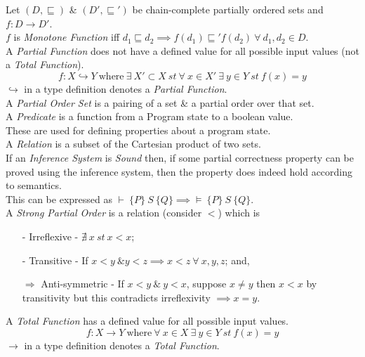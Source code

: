 \documentclass[11pt,a4paper]{article}
\begin{document}
Let $(D,\sqsubseteq)$ \& $(D',\sqsubseteq')$ be chain-complete partially ordered sets and $f:D\to D'$.\\
$f$ is \textit{Monotone Function} iff $d_1\sqsubseteq d_2\implies f(d_1)\sqsubseteq' f(d_2)\ \forall\ d_1,d_2\in D$.\\

A \textit{Partial Function} does not have a defined value for all possible input values (\ie not a \textit{Total Function}).
$$f:X\hookrightarrow Y\mathrm{\ where\ }\exists\ X'\subset X\ st\ \forall\ x\in X'\ \exists\ y\in Y\ st\ f(x)=y$$
\NB $\hookrightarrow$ in a type definition denotes a \textit{Partial Function}.\\

A \textit{Partial Order Set} is a pairing of a set \& a partial order over that set.\\

A \textit{Predicate} is a function from a Program state to a boolean value.\\
These are used for defining properties about a program state.\\

A \textit{Relation} is a subset of the Cartesian product of two sets.\\

If an \textit{Inference System} is \textit{Sound} then, if some partial correctness property can be proved using the inference system, then the property does indeed hold according to semantics.\\
\NB This can be expressed as $\vdash\ \{P\}\ S\ \{Q\}\implies\vDash\ \{P\}\ S\ \{Q\}$.\\

A \textit{Strong Partial Order} is a relation (consider $<$) which is
\begin{enumerate}[label=\roman*)]
	\item[-] Irreflexive - $\nexists\ x\ st\ x<x$;
	\item[-] Transitive - If $x<y\ \& y<z\implies x<z\ \forall\ x,y,z$; and,
	\item[$\Rightarrow$] Anti-symmetric - If $x<y\ \&\ y<x$, suppose $x\neq y$ then $x<x$ by transitivity but this contradicts irreflexivity $\implies x=y$.
\end{enumerate}

A \textit{Total Function} has a defined value for all possible input values.
$$f:X\to Y \mathrm{\ where\ }\forall\ x\in X\ \exists\ y\in Y\ st\ f(x)=y$$
\NB $\to$ in a type definition denotes a \textit{Total Function}.\\
\end{document}
